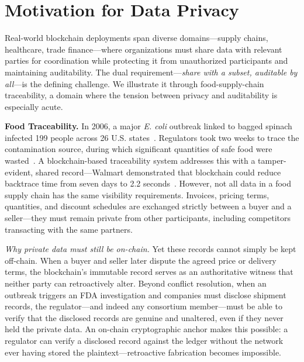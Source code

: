 \section{Motivation for Data Privacy}
\label{motivation}
Real-world blockchain deployments span diverse domains---supply chains, healthcare, trade finance---where organizations must share data with relevant parties for coordination while protecting it from unauthorized participants and maintaining auditability. The dual requirement---\textit{share with a subset, auditable by all}---is the defining challenge. We illustrate it through food-supply-chain traceability, a domain where the tension between privacy and auditability is especially acute.

\textbf{Food Traceability.}
In 2006, a major \textit{E. coli} outbreak linked to bagged spinach infected 199 people across 26 U.S. states~\cite{ecoil}. Regulators took two weeks to trace the contamination source, during which significant quantities of safe food were wasted~\cite{blockchain-for-business}. A blockchain-based traceability system addresses this with a tamper-evident, shared record---Walmart demonstrated that blockchain could reduce backtrace time from seven days to 2.2 seconds~\cite{7-to-2, walmart-hf}. However, not all data in a food supply chain has the same visibility requirements. Invoices, pricing terms, quantities, and discount schedules are exchanged strictly between a buyer and a seller---they must remain private from other participants, including competitors transacting with the same partners.

\textit{Why private data must still be on-chain.}
Yet these records cannot simply be kept off-chain. When a buyer and seller later dispute the agreed price or delivery terms, the blockchain's immutable record serves as an authoritative witness that neither party can retroactively alter. Beyond conflict resolution, when an outbreak triggers an FDA investigation and companies must disclose shipment records, the regulator---and indeed any consortium member---must be able to verify that the disclosed records are genuine and unaltered, even if they never held the private data. An on-chain cryptographic anchor makes this possible: a regulator can verify a disclosed record against the ledger without the network ever having stored the plaintext---retroactive fabrication becomes impossible.

